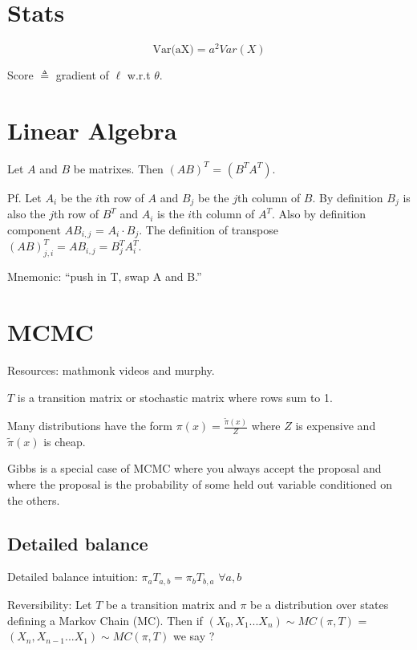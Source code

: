 \documentclass[12pt]{amsart}
\title{}
\author{}
\date{} %
\begin{document}
\maketitle
\tableofcontents

\section{Stats}

$$
\text{Var(aX)} = a^2 Var(X)
$$

Score $\triangleq$ gradient of $\ell$ w.r.t  $\theta$.

\section{Linear Algebra}

Let $A$ and $B$ be matrixes. Then $(AB)^T$ = $(B^T A^T)$. 

Pf. Let $A_i$ be the $i$th row of $A$ and $B_j$ be the $j$th column of $B$.  By definition $B_j$ is also the $j$th row of $B^T$ and $A_i$ is the $i$th column of $A^T$. Also by definition component $AB_{i,j}$ = $A_i \cdot B_j$. The definition of transpose $(AB)^T_{j,i} = AB_{i,j} = B^T_{j}A^T_i$.

Mnemonic: ``push in T, swap A and B.'' 

\section{MCMC}

Resources: mathmonk videos and murphy.

$T$ is a transition matrix or stochastic matrix where rows sum to 1.

Many distributions have the form $\pi(x) = \frac{\widetilde{\pi}(x)}{Z}$ where $Z$ is expensive and $\widetilde{\pi}(x)$ is cheap.

Gibbs is a special case of MCMC where you always accept the proposal and where the proposal is the probability of some held out variable conditioned on the others.

\subsection{Detailed balance}

Detailed balance intuition: $\pi_a T_{a,b} = \pi_b T_{b,a}$ $\forall a,b$

Reversibility:  Let $T$ be a transition matrix and $\pi$ be a distribution over states defining a Markov Chain (MC). Then if $(X_0, X_1 ... X_n) \sim MC(\pi, T)$ = $(X_n, X_{n -1} ... X_1) \sim MC(\pi, T)$ we say ? 
\end{document}
